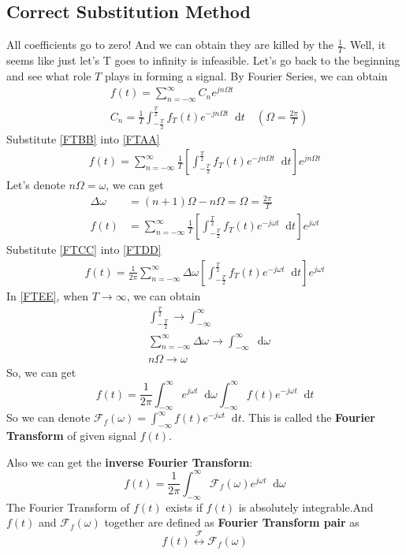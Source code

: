 \documentclass[margin,line]{res}
\newcommand*{\dif}{\mathop{}\!\mathrm{d}}
\begin{document}
\begin{resume}
\subsection{\textbf{Correct Substitution Method}}
All coefficients go to zero! And we can obtain they are killed by the $\frac{1}{T}$. Well, it seems like just let's T goes to infinity is infeasible. Let's go back to the beginning and see what role $T$ plays in forming a signal.
By Fourier Series, we can obtain
\begin{align}
	&f(t) = \sum\limits_{n=-\infty}^{\infty} C_n e^{jn \Omega t} \label{FTAA} \\
	&C_n = \frac{1}{T} \int_{-\frac{T}{2}}^{\frac{T}{2}} f_T(t) e^{-jn\Omega t} \dif t 
	\quad \left(\Omega = \frac{2\pi}{T}\right) \label{FTBB}
\end{align}
Substitute \eqref{FTBB} into \eqref{FTAA}
\begin{align}
	f(t) = \sum\limits_{n=-\infty}^{\infty} 
		   \frac{1}{T} \left[ \int_{-\frac{T}{2}}^{\frac{T}{2}} f_T(t) e^{-jn\Omega t} \dif t \right]
		   e^{jn \Omega t} \nonumber
\end{align}
Let's denote $n\Omega = \omega$, we can get
\begin{align}
	 \Delta \omega &= (n+1)\Omega - n\Omega = \Omega = \frac{2\pi}{T} \label{FTCC} \\
	 f(t) 
	 &= \sum\limits_{n=-\infty}^{\infty} 
	 \frac{1}{T} \left[ \int_{-\frac{T}{2}}^{\frac{T}{2}} f_T(t) e^{-j\omega t} \dif t \right]
	 e^{j\omega t} \label{FTDD}
\end{align}
Substitute \eqref{FTCC} into \eqref{FTDD}
\begin{align}
	f(t) = \frac{1}{2\pi} \sum\limits_{n=-\infty}^{\infty} 
	\Delta \omega \left[ \int_{-\frac{T}{2}}^{\frac{T}{2}} f_T(t) e^{-j\omega t} \dif t \right]
	e^{j\omega t} \label{FTEE}
\end{align}
In \eqref{FTEE}, when $T \rightarrow \infty$, we can obtain
\begin{align}
	& \int_{-\frac{T}{2}}^{\frac{T}{2}} \rightarrow \int_{-\infty}^{\infty} \nonumber \\
	& \sum\limits_{n=-\infty}^{\infty} \Delta \omega \rightarrow \int_{-\infty}^{\infty} \dif \omega \nonumber \\
	& n\Omega \rightarrow \omega \nonumber
\end{align}
So, we can get
$$
f(t) = \frac{1}{2\pi} \int_{-\infty}^{\infty} e^{j\omega t} \dif \omega \int_{-\infty}^{\infty} f(t) e^{-j\omega t} \dif t
$$
So we can denote $\mathscr{F}_f(\omega) = \int_{-\infty}^{\infty} f(t) e^{-j\omega t} \dif t$. This is called the \textbf{Fourier Transform} of given signal $f(t)$.\par
Also we can get the \textbf{inverse Fourier Transform}:
$$
	f(t) = \frac{1}{2\pi} \int_{-\infty}^{\infty} \mathscr{F}_f(\omega) e^{j\omega t} \dif \omega
$$
The Fourier Transform of $f(t)$ exists if $f(t)$ is absolutely integrable.And $f(t)$ and $\mathscr{F}_f(\omega)$ together are defined as \textbf{Fourier Transform pair} as
$$
f(t) \stackrel{\mathscr{F}}{\longleftrightarrow} \mathscr{F}_f(\omega)
$$

\end{resume}
\end{document}
